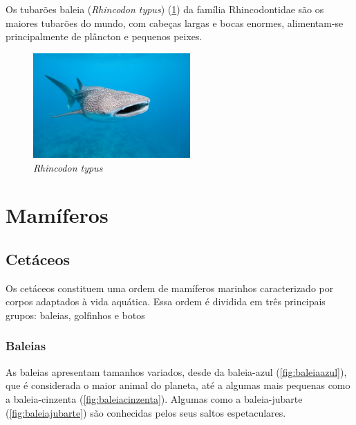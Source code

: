 \documentclass{report}
\begin{document}
\begin{enumerate}
\begin{itemize}
Os tubarões baleia (\textit{Rhincodon typus}) (\ref{fig:tubaraobaleia}) da família  Rhincodontidae são os maiores tubarões do mundo, com cabeças largas e bocas enormes, alimentam-se principalmente de plâncton e pequenos peixes.
	\end{itemize}
	
	\begin{figure}[H]
	\center
        	\includegraphics[height=4cm]{imagens/tubaraobaleia.jpg}
        	\caption{\textit{Rhincodon typus}}
        	\label{fig:tubaraobaleia}
	\end{figure}
	
\end{enumerate}

\section{Mamíferos}
\subsection{Cetáceos}
Os cetáceos constituem uma ordem de mamíferos marinhos caracterizado por corpos adaptados à vida aquática. Essa ordem é dividida em três principais grupos: baleias, golfinhos e botos


\subsubsection{Baleias}
As baleias apresentam tamanhos variados, desde da baleia-azul (\ref{fig:baleiaazul}), que é considerada o maior animal do planeta, até a algumas mais pequenas como a baleia-cinzenta (\ref{fig:baleiacinzenta}). Algumas como a baleia-jubarte (\ref{fig:baleiajubarte}) são conhecidas pelos seus saltos espetaculares.
\end{document}
